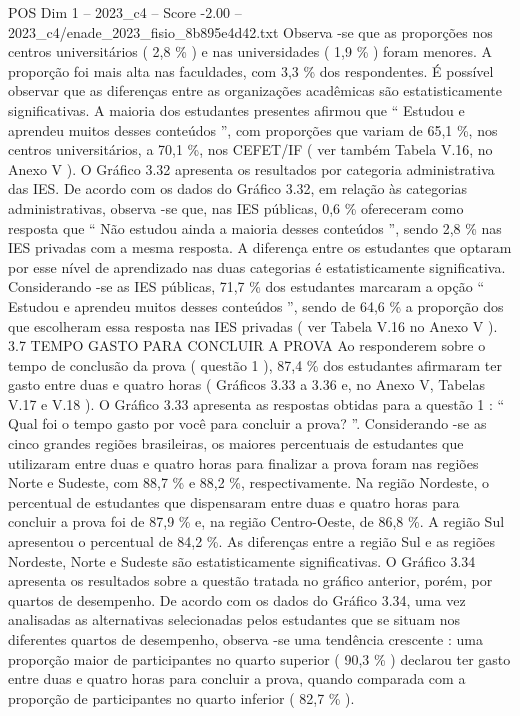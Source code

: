 \begin{textsample}{POS Dim 1 – 2023\_c4 – Score -2.00 – 2023\_c4/enade\_2023\_fisio\_8b895e4d42.txt}
Observa -se que as proporções nos centros universitários ( 2,8 \% ) e nas universidades ( 1,9 \% ) foram menores.
A proporção foi mais alta nas faculdades, com 3,3 \% dos respondentes.
É possível observar que as diferenças entre as organizações acadêmicas são estatisticamente significativas.
A maioria dos estudantes presentes afirmou que “ Estudou e aprendeu muitos desses conteúdos ”, com proporções que variam de 65,1 \%, nos centros universitários, a 70,1 \%, nos CEFET/IF ( ver também Tabela V.16, no Anexo V ).
O Gráfico 3.32 apresenta os resultados por categoria administrativa das IES.
De acordo com os dados do Gráfico 3.32, em relação às categorias administrativas, observa -se que, nas IES públicas, 0,6 \% ofereceram como resposta que “ Não estudou ainda a maioria desses conteúdos ”, sendo 2,8 \% nas IES privadas com a mesma resposta.
A diferença entre os estudantes que optaram por esse nível de aprendizado nas duas categorias é estatisticamente significativa.
Considerando -se as IES públicas, 71,7 \% dos estudantes marcaram a opção “ Estudou e aprendeu muitos desses conteúdos ”, sendo de 64,6 \% a proporção dos que escolheram essa resposta nas IES privadas ( ver Tabela V.16 no Anexo V ). 3.7 TEMPO GASTO PARA CONCLUIR A PROVA Ao responderem sobre o tempo de conclusão da prova ( questão 1 ), 87,4 \% dos estudantes afirmaram ter gasto entre duas e quatro horas ( Gráficos 3.33 a 3.36 e, no Anexo V, Tabelas V.17 e V.18 ).
O Gráfico 3.33 apresenta as respostas obtidas para a questão 1 : “ Qual foi o tempo gasto por você para concluir a prova? ”.
Considerando -se as cinco grandes regiões brasileiras, os maiores percentuais de estudantes que utilizaram entre duas e quatro horas para finalizar a prova foram nas regiões Norte e Sudeste, com 88,7 \% e 88,2 \%, respectivamente.
Na região Nordeste, o percentual de estudantes que dispensaram entre duas e quatro horas para concluir a prova foi de 87,9 \% e, na região Centro-Oeste, de 86,8 \%.
A região Sul apresentou o percentual de 84,2 \%.
As diferenças entre a região Sul e as regiões Nordeste, Norte e Sudeste são estatisticamente significativas.
O Gráfico 3.34 apresenta os resultados sobre a questão tratada no gráfico anterior, porém, por quartos de desempenho.
De acordo com os dados do Gráfico 3.34, uma vez analisadas as alternativas selecionadas pelos estudantes que se situam nos diferentes quartos de desempenho, observa -se uma tendência crescente : uma proporção maior de participantes no quarto superior ( 90,3 \% ) declarou ter gasto entre duas e quatro horas para concluir a prova, quando comparada com a proporção de participantes no quarto inferior ( 82,7 \% ).

\end{textsample}
